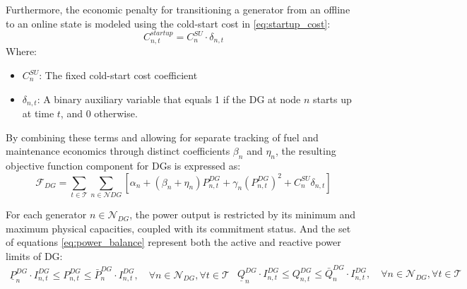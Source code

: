 \documentclass[preprint,12pt]{elsarticle}
\begin{document}
Furthermore, the economic penalty for transitioning a generator from an offline to an online state is modeled using the cold-start cost in \eqref{eq:startup_cost}:
\begin{equation}
C_{n,t}^{startup} = C_{n}^{SU} \cdot \delta_{n,t}\label{eq:startup_cost}
\end{equation}
Where:
\begin{itemize}
    \item $C_{n}^{SU}$: The fixed cold-start cost coefficient 
    \item $\delta_{n,t}$: A binary auxiliary variable that equals 1 if the DG at node $n$ starts up at time $t$, and 0 otherwise.
\end{itemize}

By combining these terms and allowing for separate tracking of fuel and maintenance economics through distinct coefficients $\beta_n$ and $\eta_n$, the resulting objective function component for DGs is expressed as:
\begin{equation}
\mathcal{F}_{DG} = \sum \limits_{t \in \mathcal{T}} \sum_{n \in \mathcal{N}{DG}} \left[ \alpha_n + (\beta_n + \eta_n) P_{n,t}^{DG} + \gamma_n (P_{n,t}^{DG})^2 + C_{n}^{SU} \delta_{n,t} \right]
\label{eq:DG_cost}
\end{equation}


For each generator $n \in \mathcal{N}_{DG}$, the power output is restricted by its minimum and maximum physical capacities, coupled with its commitment status. And the set of equations \eqref{eq:power_balance} represent both the active and reactive power limits of DG: 
\begin{subequations}
    \begin{align}
        \underline P_{n}^{DG} \cdot I_{n,t}^{DG} \le P_{n,t}^{DG} \le \bar P_{n}^{DG} \cdot I_{n,t}^{DG}, \quad \forall n \in \mathcal{N}_{DG}, \forall t \in \mathcal{T}
    \label{eq:DG_active_power} 
    \end{align}
    \begin{align}
        \underline Q_{n}^{DG} \cdot I_{n,t}^{DG} \le Q_{n,t}^{DG} \le \bar Q_{n}^{DG} \cdot I_{n,t}^{DG}, \quad \forall n \in \mathcal{N}_{DG}, \forall t \in \mathcal{T}
        \label{eq:DG_reactive_power}
    \end{align}
    \label{eq:power_balance}
\end{subequations}
\end{document}
